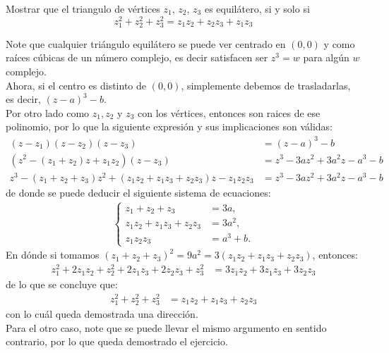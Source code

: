 \begin{homeworkProblem}
  Mostrar que el triangulo de vértices $z_1$, $z_2$, $z_3$ es equilátero, si y solo si
  $$z_1^2+z_2^2+z_3^2=z_1z_2+z_2z_3+z_1z_3$$
  \begin{solution}
    Note que cualquier triángulo equilátero se puede ver centrado en $(0,0)$ y como raíces cúbicas de un número complejo, es decir satisfacen ser $z^3=w$ para algún $w$ complejo.\\
    Ahora, si el centro es distinto de $(0,0)$, simplemente debemos de trasladarlas, es decir, $(z-a)^3-b$.\\
    Por otro lado como $z_1,z_2$ y $z_3$ con los vértices, entonces son raices de ese polinomio, por lo que la siguiente expresión y sus implicaciones son válidas:
    \begin{align*}
      (z-z_1)(z-z_2)(z-z_3)&=(z-a)^3-b\\
      (z^{2}-(z_1+z_2)z+z_1z_2)(z-z_3)&=z^{3}-3az^{2}+3a^2z-a^3-b\\
      z^{3}-(z_1+z_2+z_3)z^2+(z_1z_2+z_1z_3+z_2z_3)z-z_1z_2z_3&=z^{3}-3az^{2}+3a^2z-a^3-b
    \end{align*}
    de donde se puede deducir el siguiente sistema de ecuaciones:
    \begin{align*}
      \begin{cases}
        z_1+z_2+z_3&=3a\text{,} \\
        z_1z_2+z_1z_3+z_2z_3&=3a^2,\\
        z_1z_2z_3&=a^3+b.
      \end{cases}
    \end{align*}
    En dónde si tomamos $(z_1+z_2+z_3)^2=9a^2=3(z_1z_2+z_1z_3+z_2z_3)$, entonces:
    \begin{align*}
      z_1^2 + 2z_1z_2 + z_2^2 + 2z_1z_3 + 2z_2z_3 + z_3^2&=3z_1z_2+3z_1z_3+3z_2z_3
    \end{align*}
    de lo que se concluye que:
    \begin{align*}
      z_1^2+z_2^2+z_3^2&=z_1z_2+z_1z_3+z_2z_3
    \end{align*}
    con lo cuál queda demostrada una dirección.\\
    Para el otro caso, note que se puede llevar el mismo argumento en sentido contrario, por lo que queda demostrado el ejercicio.
  \end{solution}
\end{homeworkProblem}
